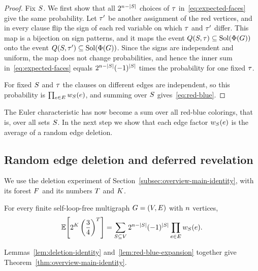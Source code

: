 \begin{proof}
Fix \(S\). We first show that all \(2^{n-|S|}\) choices of
\(\tau\) in~\eqref{eq:expected-faces} give the same probability. Let
\(\tau'\) be another assignment of the red vertices, and in every clause
flip the sign of each red variable on which \(\tau\) and \(\tau'\)
differ. This map is a bijection on sign patterns, and it maps the event
\(Q(S,\tau)\subseteq\operatorname{Sol}(\Phi(G))\) onto the event
\(Q(S,\tau')\subseteq\operatorname{Sol}(\Phi(G))\). Since the signs are
independent and uniform, the map does not change probabilities, and hence the
inner sum in~\eqref{eq:expected-faces} equals
\(2^{n-|S|}(-1)^{|S|}\) times the probability for one fixed
\(\tau\).

For fixed \(S\) and \(\tau\) the clauses on different edges are
independent, so this probability is \(\prod_{e\in E}w_{S}(e)\),
and summing over \(S\) gives~\eqref{eq:red-blue}.
\end{proof}

The Euler characteristic has now become a sum over all red-blue colorings, that
is, over all sets \(S\). In the next step we show that each edge factor
\(w_{S}(e)\) is the average of a random edge deletion.

\subsection{Random edge deletion and deferred revelation}\label{subsec:deferred-definition}

We use the deletion experiment of Section~\ref{subsec:overview-main-identity},
with its forest \(F\) and its numbers \(T\) and \(K\).

\begin{lemma}\label{lem:deletion-identity}
For every finite self-loop-free multigraph \(G=(V,E)\) with
\(n\) vertices,
\[
  \Ex{2^\Kdef\left(\frac34\right)^\Tdef}
  =
  \sum_{\freeset\subseteq\Vset}
  2^{\nvert-|\freeset|}(-1)^{|\freeset|}
  \prod_{e\in \Eset}\edgefac{\freeset}{e}.
\]
\end{lemma}

Lemmas~\ref{lem:deletion-identity} and~\ref{lem:red-blue-expansion} together
give Theorem~\ref{thm:overview-main-identity}.

